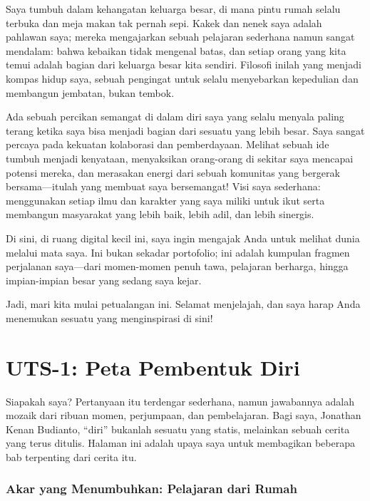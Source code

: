 \documentclass[
  letterpaper,
  DIV=11,
  numbers=noendperiod]{scrreprt}
\begin{document}
Saya tumbuh dalam kehangatan keluarga besar, di mana pintu rumah selalu
terbuka dan meja makan tak pernah sepi. Kakek dan nenek saya adalah
pahlawan saya; mereka mengajarkan sebuah pelajaran sederhana namun
sangat mendalam: bahwa kebaikan tidak mengenal batas, dan setiap orang
yang kita temui adalah bagian dari keluarga besar kita sendiri. Filosofi
inilah yang menjadi kompas hidup saya, sebuah pengingat untuk selalu
menyebarkan kepedulian dan membangun jembatan, bukan tembok.

Ada sebuah percikan semangat di dalam diri saya yang selalu menyala
paling terang ketika saya bisa menjadi bagian dari sesuatu yang lebih
besar. Saya sangat percaya pada kekuatan kolaborasi dan pemberdayaan.
Melihat sebuah ide tumbuh menjadi kenyataan, menyaksikan orang-orang di
sekitar saya mencapai potensi mereka, dan merasakan energi dari sebuah
komunitas yang bergerak bersama---itulah yang membuat saya bersemangat!
Visi saya sederhana: menggunakan setiap ilmu dan karakter yang saya
miliki untuk ikut serta membangun masyarakat yang lebih baik, lebih
adil, dan lebih sinergis.

Di sini, di ruang digital kecil ini, saya ingin mengajak Anda untuk
melihat dunia melalui mata saya. Ini bukan sekadar portofolio; ini
adalah kumpulan fragmen perjalanan saya---dari momen-momen penuh tawa,
pelajaran berharga, hingga impian-impian besar yang sedang saya kejar.

Jadi, mari kita mulai petualangan ini. Selamat menjelajah, dan saya
harap Anda menemukan sesuatu yang menginspirasi di sini!


\chapter{UTS-1: Peta Pembentuk Diri}\label{uts-1-peta-pembentuk-diri}

Siapakah saya? Pertanyaan itu terdengar sederhana, namun jawabannya
adalah mozaik dari ribuan momen, perjumpaan, dan pembelajaran. Bagi
saya, Jonathan Kenan Budianto, ``diri'' bukanlah sesuatu yang statis,
melainkan sebuah cerita yang terus ditulis. Halaman ini adalah upaya
saya untuk membagikan beberapa bab terpenting dari cerita itu.

\subsection{Akar yang Menumbuhkan: Pelajaran dari
Rumah}\label{akar-yang-menumbuhkan-pelajaran-dari-rumah}
\end{document}
